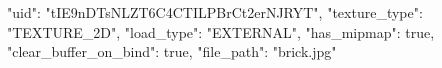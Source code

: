 {
    "uid": "tIE9nDTsNLZT6C4CTILPBrCt2erNJRYT",
    "texture_type": "TEXTURE_2D",
    "load_type": "EXTERNAL",
    "has_mipmap": true,
    "clear_buffer_on_bind": true,
    "file_path": "brick.jpg"
}